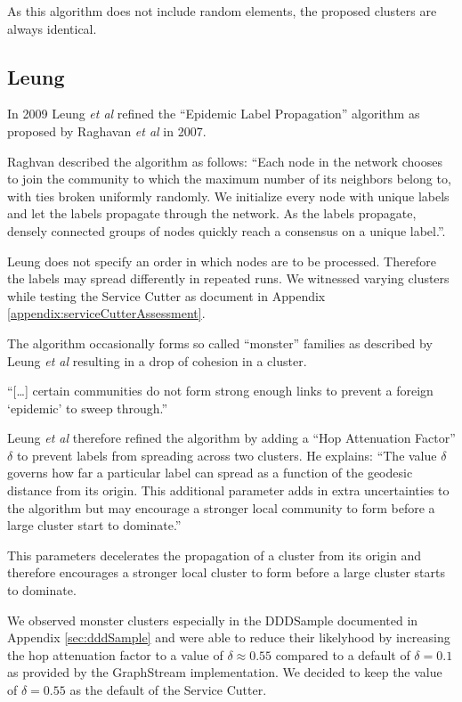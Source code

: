 As this algorithm does not include random elements, the proposed clusters are always identical.

\subsection{Leung}
\label{sec:monsterclusters}

In 2009 Leung \textit{et al}\cite{leung} refined the \enquote{Epidemic Label Propagation} algorithm as proposed by Raghavan \textit{et al}\cite{raghavan} in 2007. 

Raghvan described the algorithm as follows: \enquote{Each node in the network chooses to
join the community to which the maximum number of its neighbors belong to, with ties broken uniformly randomly. We initialize every node with unique labels and let the labels propagate through the network. As the labels propagate, densely connected groups of nodes quickly reach a consensus on a unique label.}\cite[p. 4]{raghavan}.

Leung does not specify an order in which nodes are to be processed. Therefore the labels may spread differently in repeated runs. We witnessed varying clusters while testing the Service Cutter as document in Appendix \ref{appendix:serviceCutterAssessment}.

The algorithm occasionally forms so called \enquote{monster} families as described by Leung \textit{et al} resulting in a drop of cohesion in a cluster. 

\enquote{[\dots] certain communities do not form strong enough links to prevent a foreign \enquote{epidemic} to sweep through.}\cite[p. 5]{leung}

Leung \textit{et al} therefore refined the algorithm by adding a \enquote{Hop Attenuation Factor} $\delta$ to prevent labels from spreading across two clusters. He explains: \enquote{The value $\delta$ governs how far a particular label can spread as a function of the geodesic distance from its origin. This additional parameter adds in extra uncertainties
to the algorithm but may encourage a stronger local community to form before a large cluster start to dominate.}\cite[p. 5]{leung}

This parameters decelerates the propagation of a cluster from its origin and therefore encourages a stronger local cluster to form before a large cluster starts to dominate.

We observed monster clusters especially in the DDDSample documented in Appendix \ref{sec:dddSample} and were able to reduce their likelyhood by increasing the hop attenuation factor to a value of $\delta \approx 0.55$ compared to a default of $ \delta = 0.1$ as provided by the GraphStream implementation. We decided to keep the value of $\delta = 0.55$ as the default of the Service Cutter.

